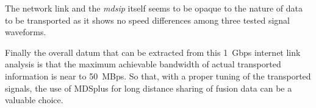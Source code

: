 \documentclass[10pt,a4paper]{article}
\begin{document}
The network link and the \emph{mdsip} itself seems to be opaque to the nature of data to be transported as it shows no speed differences among three tested signal waveforms.

Finally the overall datum that can be extracted from this 1~Gbps internet link analysis is that the maximum achievable bandwidth of actual transported information is near to 50~MBps.
So that, with a proper tuning of the transported signals, the use of MDSplus for long distance sharing of fusion data can be a valuable choice.
\end{document}
